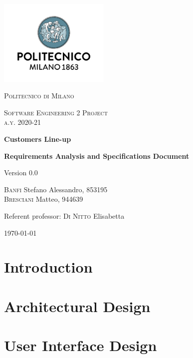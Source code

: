 \documentclass[fontsize=11pt,paper=a4,pagesize=auto]{report}
\begin{document}
\begin{titlepage}
	\centering
	\includegraphics[width=150pt]{images/polimi.jpg}\par\vspace{1cm}
	{\scshape\LARGE
		Politecnico di Milano\par}
	\vspace{1cm}
	{\scshape\Large
		Software Engineering 2 Project\\
		a.y. 2020-21\par}
	\vspace{1.5cm}
	{\huge\bfseries
		Customers Line-up\\\par}
	{\Large\bfseries
		Requirements Analysis and Specifications Document\par}
	Version 0.0\par
	\vspace{2cm}
	{\Large
		{\scshape Banfi}  Stefano Alessandro, 853195\\
		{\scshape Bresciani} Matteo, 944639\par}
	\vfill
	Referent professor: {\scshape Di Nitto} Elisabetta\par
	\vfill
	{\large\today\par}
\end{titlepage}



\tableofcontents

\chapter{Introduction}



\chapter{Architectural Design}



\chapter{User Interface Design}

\end{document}
